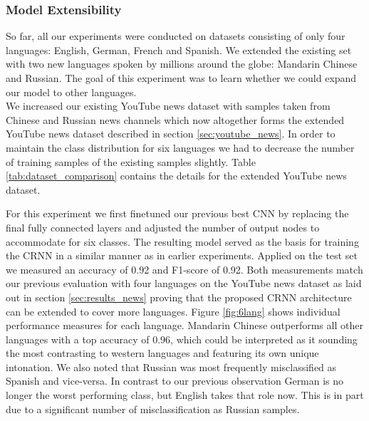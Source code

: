 \subsubsection{Model Extensibility} 
\label{sec:extensibility}
So far, all our experiments were conducted on datasets consisting of only four languages: English, German, French and Spanish. We extended the existing set with two new languages spoken by millions around the globe: Mandarin Chinese and Russian. The goal of this experiment was to learn whether we could expand our model to other languages. \\
We increased our existing YouTube news dataset with samples taken from Chinese and Russian news channels which now altogether forms the extended YouTube news dataset described in section \ref{sec:youtube_news}. In order to maintain the class distribution for six languages we had to decrease the number of training samples of the existing samples slightly. Table \ref{tab:dataset_comparison} contains the details for the extended YouTube news dataset.

For this experiment we first finetuned our previous best CNN by replacing the final fully connected layers and adjusted the number of output nodes to accommodate for six classes. The resulting model served as the basis for training the CRNN in a similar manner as in earlier experiments. Applied on the test set we measured an accuracy of 0.92 and F1-score of 0.92. Both measurements match our previous evaluation with four languages on the YouTube news dataset as laid out in section \ref{sec:results_news} proving that the proposed CRNN architecture can be extended to cover more languages. Figure \ref{fig:6lang} shows individual performance measures for each language. Mandarin Chinese outperforms all other languages with a top accuracy of 0.96, which could be interpreted as it sounding the most contrasting to western languages and featuring its own unique intonation. We also noted that Russian was most frequently misclassified as Spanish and vice-versa. In contrast to our previous observation German is no longer the worst performing class, but English takes that role now. This is in part due to a significant number of misclassification as Russian samples.

